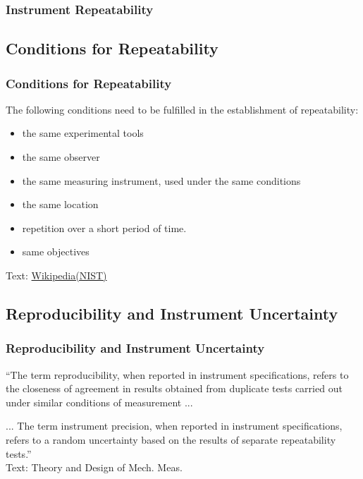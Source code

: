 \documentclass[fleqn]{beamer} %
\newcommand{\sectionIIIsubsectionItitle}{Instrument Repeatability}
\newcommand{\sectionIIIsubsectionIItitle}{Conditions for Repeatability}
\newcommand{\sectionIIIsubsectionIIItitle}{Reproducibility and Instrument Uncertainty}
\begin{document}
			\begin{frame}
				\frametitle{\sectionIIIsubsectionItitle}
		
			\end{frame}

		\subsection{\sectionIIIsubsectionIItitle}\label{sectionIIIsubsectionII}	

			\begin{frame}
				\frametitle{\sectionIIIsubsectionIItitle}

				The following conditions need to be fulfilled in the establishment of repeatability:
				\begin{itemize}

					\item the same experimental tools
					\item the same observer
					\item the same measuring instrument, used under the same conditions
					\item the same location
					\item repetition over a short period of time.
					\item same objectives

				\end{itemize}
				\vspace{5mm}
				{\tiny Text: \href{https://en.wikipedia.org/wiki/Repeatability}{Wikipedia(NIST)} }

			\end{frame}

		\subsection{\sectionIIIsubsectionIIItitle}\label{sectionIIIsubsectionIII}

			\begin{frame}
				\frametitle{\sectionIIIsubsectionIIItitle}

				``The term {\GR reproducibility}, when reported in instrument specifications, refers to the closeness of
				agreement in results obtained from duplicate tests carried out under similar conditions of
				measurement ... \vspcc

				... The term {\PR instrument precision}, when reported in instrument specifications, refers to a random
				uncertainty based on the results of separate repeatability tests.'' \vspace{10mm} \\

				{\tiny Text: Theory and Design of Mech. Meas.}
		
			\end{frame}
\end{document}

